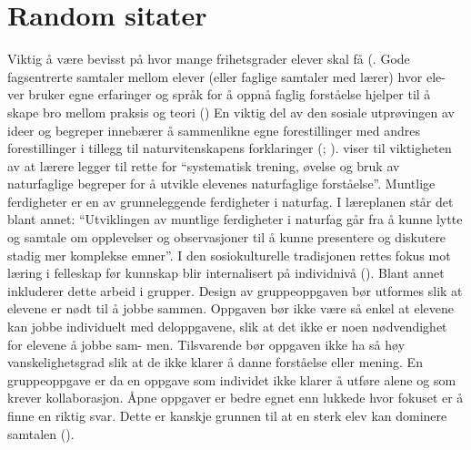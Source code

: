 \documentclass[main.tex]{subfiles}
\begin{document}
\section{Random sitater}
Viktig å være bevisst på hvor mange frihetsgrader elever skal få (.
\newline
Gode fagsentrerte samtaler mellom elever (eller faglige samtaler med lærer) hvor ele-
ver bruker egne erfaringer og språk for å oppnå faglig forståelse hjelper til å skape bro mellom
praksis og teori ()
\newline
En viktig del av den sosiale utprøvingen av ideer og begreper innebærer å sammenlikne egne forestillinger med andres forestillinger i tillegg til naturvitenskapens forklaringer (; ).
\newline
{} viser til viktigheten av at lærere
legger til rette for ``systematisk trening, øvelse og bruk av naturfaglige begreper for å utvikle
elevenes naturfaglige forståelse''. Muntlige ferdigheter er en av grunneleggende ferdigheter i naturfag. 
I læreplanen står det blant annet: ``Utviklingen av muntlige ferdigheter i naturfag går
fra å kunne lytte og samtale om opplevelser og observasjoner til å kunne presentere og diskutere 
stadig mer komplekse emner''. I den sosiokulturelle tradisjonen rettes fokus mot læring i
felleskap før kunnskap blir internalisert på individnivå (). Blant annet inkluderer 
dette arbeid i grupper.
\newline
Design av gruppeoppgaven bør utformes slik at
elevene er nødt til å jobbe sammen. Oppgaven bør ikke være så enkel at elevene kan jobbe
individuelt med deloppgavene, slik at det ikke er noen nødvendighet for elevene å jobbe sam-
men. Tilsvarende bør oppgaven ikke ha så høy vanskelighetsgrad slik at de ikke klarer å danne
forståelse eller mening. En gruppeoppgave er da en oppgave som individet ikke klarer å utføre
alene og som krever kollaborasjon. Åpne oppgaver er bedre egnet enn lukkede hvor fokuset er
å finne en riktig svar. Dette er kanskje grunnen til at en sterk elev kan dominere samtalen 
().
\end{document}

